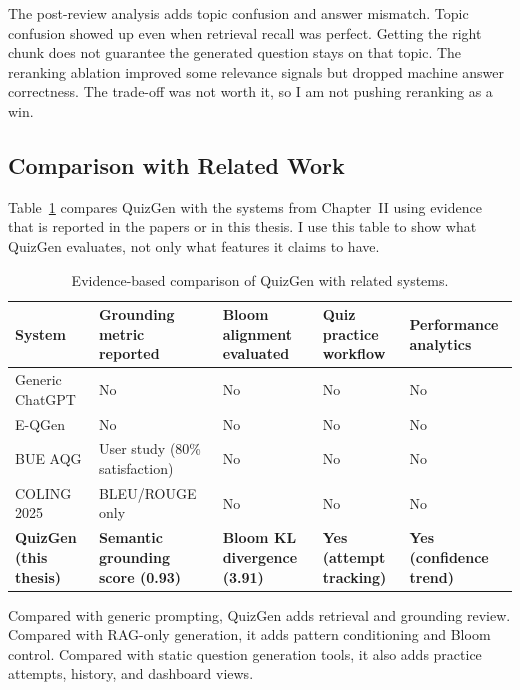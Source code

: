 \documentclass[12pt,a4paper]{article}
\begin{document}
The post-review analysis adds topic confusion and answer mismatch. Topic
confusion showed up even when retrieval recall was perfect. Getting the
right chunk does not guarantee the generated question stays on that topic.
The reranking ablation improved some relevance signals but dropped machine
answer correctness. The trade-off was not worth it, so I am not pushing
reranking as a win.

\subsection{Comparison with Related Work}

Table~\ref{tab:related-comparison} compares QuizGen with the systems from
Chapter~II using evidence that is reported in the papers or in this thesis.
I use this table to show what QuizGen evaluates, not only what features it
claims to have.

\begin{table}[H]
  \centering
  \singlespacing
  \caption{Evidence-based comparison of QuizGen with related systems.}
  \label{tab:related-comparison}
  \begin{tabular}{@{}p{3.2cm}p{2.2cm}p{2.2cm}p{2.2cm}p{2.2cm}@{}}
    \toprule
    \textbf{System} &
    \textbf{Grounding metric reported} &
    \textbf{Bloom alignment evaluated} &
    \textbf{Quiz practice workflow} &
    \textbf{Performance analytics} \\
    \midrule
    Generic ChatGPT         & No & No & No & No \\
    E-QGen \cite{eqgen2024} & No & No & No & No \\
    BUE AQG \cite{bueaqg2024} & User study (80\% satisfaction) & No & No & No \\
    COLING 2025 \cite{coling2025mcq} & BLEU/ROUGE only & No & No & No \\
    \textbf{QuizGen (this thesis)} &
      \textbf{Semantic grounding score (0.93)} &
      \textbf{Bloom KL divergence (3.91)} &
      \textbf{Yes (attempt tracking)} &
      \textbf{Yes (confidence trend)} \\
    \bottomrule
  \end{tabular}
\end{table}

Compared with generic prompting, QuizGen adds retrieval and grounding
review. Compared with RAG-only generation, it adds pattern conditioning and
Bloom control. Compared with static question generation tools, it also adds
practice attempts, history, and dashboard views.
\end{document}
